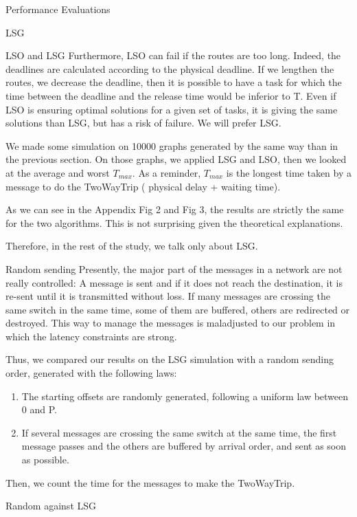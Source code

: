 \documentclass[a4paper,10pt]{report}
\begin{document}
\begin{chapter}{Performance Evaluations}
\begin{section}{LSG}
\begin{subsection}{LSO and LSG}
Furthermore, LSO can fail if the routes are too long. Indeed, the deadlines are calculated according to the physical deadline. If we lengthen the routes, we decrease the deadline, then it is possible to have a task for which the time between the deadline and the release time would be inferior to T.
Even if LSO is ensuring optimal solutions for a given set of tasks, it is giving the same solutions than LSG, but
has a risk of failure. We will prefer LSG.

We made some simulation on 10000 graphs generated by the same way than in the previous section.
On those graphs, we applied LSG and LSO, then we looked at the average and worst $T_{max}$.
As a reminder, $T_{max}$ is the longest time taken by a message to do the TwoWayTrip ( physical delay + waiting time).

As we can see in the Appendix Fig 2 and Fig 3, the results are strictly the same for the two algorithms. This is not surprising given the
theoretical explanations.

Therefore, in the rest of the study, we talk only about LSG.
\end{subsection}


\begin{subsection}{Random sending}
Presently, the major part of the messages in a network are not really controlled: A message is sent and if it does not reach the destination,
it is re-sent until it is transmitted without loss. If many messages are crossing the same switch in the same time, some of them are buffered,
others are redirected or destroyed. This way to manage the messages is maladjusted to our problem in which the latency constraints are strong.

Thus, we compared our results on the LSG simulation with a random sending order, generated with the following laws: 
\begin{enumerate}
 \item The starting offsets are randomly generated, following a uniform law between 0 and P.
 \item If several messages are crossing the same switch at the same time, the first message passes and the others are buffered by arrival order, and sent as soon as possible.
\end{enumerate}

Then, we count the time for the messages to make the TwoWayTrip.
\end{subsection}

\begin{subsection}{Random against LSG}
 

\end{subsection}
\end{section}
\end{chapter}
\end{document}
